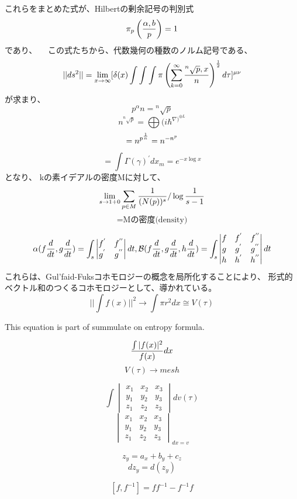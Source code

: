 \documentclass{jsarticle}
\begin{document}
      これらをまとめた式が、Hilbertの剰余記号の判別式
      $$ \mathcal{\pi}_{p}\left({{\alpha,b} \over 
      {p}}\right) = 1 $$
      であり、
    　この式たちから、代数幾何の種数のノルム記号である、
$$ ||ds^2|| = \lim_{x \to \infty} [\delta(x) \int \int \int \pi \left( \sum_{k=0}^{\infty}
		{{}^n\sqrt{p},x \over n} \right)
^{1 \over 2}d \tau]^{\mu\nu} $$
     が求まり、
     $$ p^{\alpha} n = {}^n \sqrt{p} $$
     $$ n^{{}^n\sqrt{p}} = \bigoplus{(i \hbar^{{{\nabla)}}^{\oplus 
     L}}} $$
     $$ = n^{p^{{1 \over n}}} = n^{{-n}^{p}}  $$
     $$ = \int \Gamma(\gamma)^{'}dx_m = e^{-x \log x} $$
     となり、
     kの素イデアルの密度Mに対して、
     $$ \lim_{s \to {1 + 0}} \sum_{{p \in M}} {
	     1 \over (N(p))^{s}}/ \log {1 \over 
     {s - 1} } $$
     $$ = \text{Mの密度(density)} $$

     $$ \alpha(f{d \over dt},g{d \over dt}) = \int_s \begin{vmatrix}
	     f^{'} & f^{''} \\
	     g^{'} & g^{''} \end{vmatrix}dt,
	     \mathcal{B}(f{d \over dt},g{d \over dt},h{d \over dt}) =
	     \int_s \begin{vmatrix} f & f^{'} & f^{''} \\
		     g & g^{'} & g^{''} \\
	     h & h^{'} & h^{''} \end{vmatrix}dt $$
    これらは、Gul'faid-Fuksコホモロジーの概念を局所化することにより、
    形式的ベクトル和のつくるコホモロジーとして、導かれている。
$$ || \int f(x) ||^2 \to \int \pi r^2 dx \cong V(\tau) $$

 This equation is part of summulate on entropy formula.

 $$ {\int |f(x)|^2 \over f(x)} dx $$
$$V(\tau) \to mesh $$

 $$ \int \begin{vmatrix} x_1 & x_2 & x_3 \\
    y_1 & y_2 & y_3 \\
    z_1 & z_2 & z_3 \end{vmatrix} dv({\tau}) $$
 $$ \begin{vmatrix} x_1 & x_2 & x_3 \\
    y_1 & y_2 & y_3 \\
    z_1 & z_2 & z_3 \end{vmatrix}_{dx=v}  $$


   $$ z_y = a_x + b_y + c_z $$
$$ dz_y = d(z_y) $$

$$ [f, f^{-1}] = ff^{-1} - f^{-1}f $$
\end{document}
